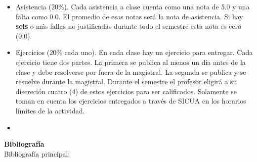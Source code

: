 \documentclass[letterpaper,10pt,onecolumn]{article}
\begin{document}
\begin{itemize}
\item Asistencia ($20\%$). Cada asistencia a clase cuenta como una
  nota de 5.0 y una falta como 0.0. El promedio de esas notas ser\'a
  la nota de asistencia. 
  Si hay {\bf seis} o m\'as fallas no justificadas durante todo el
  semestre esta nota es cero (0.0).
\item Ejercicios ($20\%$ cada uno). En cada clase hay un ejercicio para
  entregar. Cada ejercicio tiene dos partes. 
  La primera se publica al menos un d\'ia antes de la clase y debe
  resolverse por fuera de la magistral. 
  La segunda se publica y se resuelve durante la magistral.
  Durante el semestre el profesor eligir\'a a su discreci\'on cuatro (4)
  de estos ejercicios para ser calificados.
  Solamente se toman en cuenta los ejercicios entregados a trav\'es de
  SICUA en los horarios l\'imites de la actividad.
\item 
\end{itemize}

\vspace*{0.5cm} 

\newpage
{}
\noindent\textbf{\large {} \quad
  Bibliograf\'ia}\\[-0.2cm] 



\noindent\normalsize Bibliograf\'ia principal:
\end{document}
